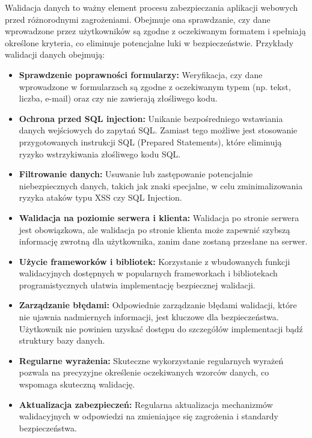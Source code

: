 \documentclass[12pt,twoside]{article}
\begin{document}
Walidacja danych to ważny element procesu zabezpieczania aplikacji webowych przed różnorodnymi zagrożeniami. Obejmuje ona sprawdzanie, czy dane wprowadzone przez użytkowników są zgodne z oczekiwanym formatem i spełniają określone kryteria, co eliminuje potencjalne luki w bezpieczeństwie. Przykłady walidacji danych obejmują:
\begin{itemize}
    

    \item \textbf{Sprawdzenie poprawności formularzy:} Weryfikacja, czy dane wprowadzone w formularzach są zgodne z oczekiwanym typem (np. tekst, liczba, e-mail) oraz czy nie zawierają złośliwego kodu.

    \item \textbf{Ochrona przed SQL injection:} Unikanie bezpośredniego wstawiania danych wejściowych do zapytań SQL. Zamiast tego możliwe jest stosowanie przygotowanych instrukcji SQL (Prepared Statements), które eliminują ryzyko wstrzykiwania złośliwego kodu SQL.

    \item \textbf{Filtrowanie danych:} Usuwanie lub zastępowanie potencjalnie niebezpiecznych danych, takich jak znaki specjalne, w celu zminimalizowania ryzyka ataków typu XSS czy SQL Injection.

    \item \textbf{Walidacja na poziomie serwera i klienta:} Walidacja po stronie serwera jest obowiązkowa, ale walidacja po stronie klienta może zapewnić szybszą informację zwrotną dla użytkownika, zanim dane zostaną przesłane na serwer.

    \item \textbf{Użycie frameworków i bibliotek:} Korzystanie z wbudowanych funkcji walidacyjnych dostępnych w popularnych frameworkach i bibliotekach programistycznych ułatwia implementację bezpiecznej walidacji.

    \item \textbf{Zarządzanie błędami:} Odpowiednie zarządzanie błędami walidacji, które nie ujawnia nadmiernych informacji, jest kluczowe dla bezpieczeństwa. Użytkownik nie powinien uzyskać dostępu do szczegółów implementacji bądź struktury bazy danych.

    \item \textbf{Regularne wyrażenia:} Skuteczne wykorzystanie regularnych wyrażeń pozwala na precyzyjne określenie oczekiwanych wzorców danych, co wspomaga skuteczną walidację.

    \item \textbf{Aktualizacja zabezpieczeń:} Regularna aktualizacja mechanizmów walidacyjnych w odpowiedzi na zmieniające się zagrożenia i standardy bezpieczeństwa.
\end{itemize}
\end{document}
